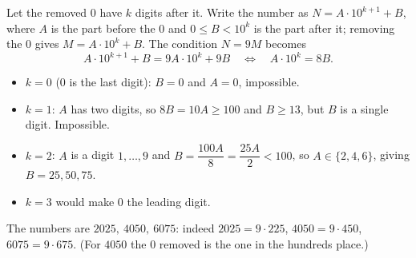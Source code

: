 Let the removed $0$ have $k$ digits after it. Write the number as $N=A\cdot10^{k+1}+B$, where $A$ is the part before the $0$ and $0\le B<10^k$ is the part after it; removing the $0$ gives $M=A\cdot10^k+B$. The condition $N=9M$ becomes
\[
A\cdot10^{k+1}+B=9A\cdot10^k+9B\quad\Longleftrightarrow\quad A\cdot10^k=8B .
\]
\begin{itemize}
\item $k=0$ ($0$ is the last digit): $B=0$ and $A=0$, impossible.
\item $k=1$: $A$ has two digits, so $8B=10A\ge100$ and $B\ge13$, but $B$ is a single digit. Impossible.
\item $k=2$: $A$ is a digit $1,\dots,9$ and $B=\dfrac{100A}{8}=\dfrac{25A}{2}<100$, so $A\in\{2,4,6\}$, giving $B=25,50,75$.
\item $k=3$ would make $0$ the leading digit.
\end{itemize}
The numbers are $\boxed{2025,\ 4050,\ 6075}$: indeed $2025=9\cdot225$, $4050=9\cdot450$, $6075=9\cdot675$. (For $4050$ the $0$ removed is the one in the hundreds place.)
